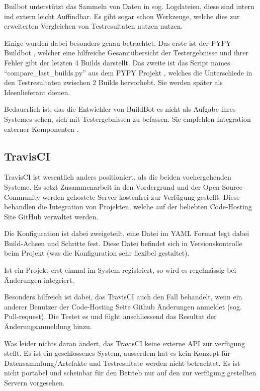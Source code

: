 Builbot unterst\"utzt das Sammeln von Daten in sog. Logdateien,
diese sind intern ind extern leicht Auffindbar.
Es gibt sogar schon Werkzeuge, welche dies zur erweiterten Vergleichen von Testresultaten nutzen nutzen.

Einige wurden dabei besonders genau betrachtet.
Das erste ist der PYPY Buildbot \cite{pypy:overview} , welcher eine hilfreiche Gesamtübersicht der Testergebnisse und ihrer Fehler gibt
der letzten 4 Builds darstellt.
Das zweite ist das Script names ``compare\_last\_builds.py''
aus dem PYPY Projekt \cite{pypy:diffscript} ,
welches die Unterschiede in den Testresultaten zwischen 2 Builds hervorhebt.
Sie werden sp\"ater als Ideenlieferant dienen.

Bedauerlich ist, das die Entwichler von BuildBot es nicht als Aufgabe ihres Systemes sehen,
sich mit Testergebnissen zu befassen.
Sie empfehlen Integration externer Komponenten \cite{buildbot:irc}.

\subsection{TravisCI}


TravisCI \cite{travisci:website} ist wesentlich anders positioniert, als die beiden voehergehenden Systeme.
Es setzt Zusammenarbeit in den Vordergrund und der Open-Source Community werden gehostete Server
kostenfrei zur Verf\"ugung gestellt.
Diese behandlen die Integration von Projekten,
welche auf der beliebten Code-Hosting Site GitHub verwaltet werden.

Die Konfiguration ist dabei zweigeteilt,
eine Datei im YAML Format legt dabei Build-Achsen und Schritte fest.
Diese Datei befindet sich in Versionskontrolle beim Projekt
(was die Konfiguration sehr flexibel gestaltet).

Ist ein Projekt erst einmal im System registriert,
so wird es regelm\"assig bei \"Anderungen integriert.

Besonders hilfreich ist dabei, das TravisCI auch den Fall behandelt,
wenn ein anderer Benutzer der Code-Hosting Seite Github \"Anderungen anmeldet
\cite{github:pullreq} (sog. Pull-request).
Die Testet es und f\"ught anschliessend das Resultat der \"Anderungsanmeldung hinzu.

Was leider nichts daran \"andert, das TravisCI keine externe API zur verf\"ugung stellt.
Es ist ein geschlossenes System, ausserdem hat es kein Konzept f\"ur Datensammlung/Artefakte
und Testresultate werden nicht betrachtet.
Es ist nicht portabel und scheinbar f\"ur den Betrieb nur
auf den zur verf\"ugung gestellten Servern vorgesehen.


